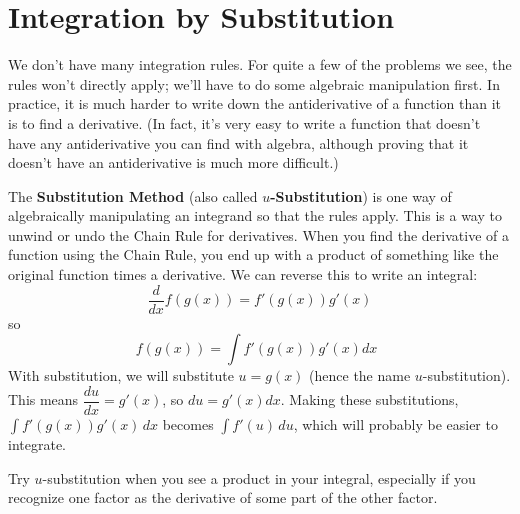 \section{Integration by Substitution}
\label{sec:substitution}
We don't have many integration rules. For quite a few of the problems we see, the rules won't directly apply; we'll have to do some algebraic manipulation first. In practice, it is much harder to write down the antiderivative of a function than it is to find a derivative. (In fact, it's very easy to write a function that doesn't have any antiderivative you can find with algebra, although proving that it doesn't have an antiderivative is much more difficult.)

The {\bf Substitution Method} (also called $u${\bf-Substitution}) is one way of algebraically manipulating an integrand so that the rules apply. This is a way to unwind or undo the Chain Rule for derivatives. When you find the derivative of a function using the Chain Rule, you end up with a product of something like the original function times a derivative. We can reverse this to write an integral:
$$\dfrac{d}{dx}f(g(x))=f'(g(x))g'(x)$$
so
$$f(g(x))=\int f'(g(x))g'(x)dx \enspace $$
With substitution, we will substitute $u=g(x)$ (hence the name $u$-substitution). This means $\dfrac{du}{dx}=g'(x)$, so $du=g'(x)dx$. Making these substitutions, $\int f'(g(x))g'(x)\,dx$ becomes $\int f'(u)\,du$, which will probably be easier to integrate.

Try $u$-substitution when you see a product in your integral, especially if you recognize one factor as the derivative of some part of the other factor.

